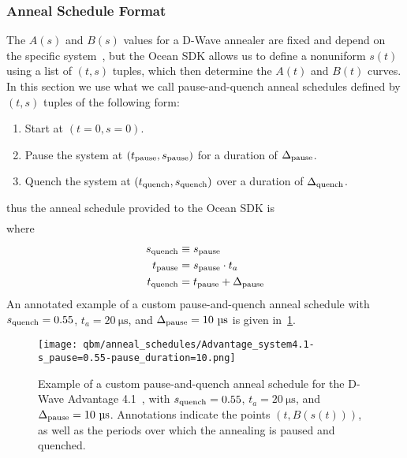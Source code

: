\subsubsection{Anneal Schedule Format}
The \( A(s) \) and \( B(s) \) values for a D-Wave annealer are fixed and depend on the specific system~\cite{dwave_anneal_schedules}, but the Ocean SDK allows us to define a nonuniform \( s(t) \) using a list of \( (t, s) \) tuples, which then determine the \( A(t) \) and \( B(t) \) curves.
In this section we use what we call pause-and-quench anneal schedules defined by \( (t, s) \) tuples of the following form:
\begin{enumerate}
    \item Start at \( (t = 0, s = 0) \).
    \item Pause the system at \( (t_{\text{pause}}, s_{\text{pause}}) \) for a duration of \( \Delta_{\text{pause}} \).
    \item Quench the system at \( (t_{\text{quench}}, s_{\text{quench}}) \) over a duration of \( \Delta_{\text{quench}} \).
\end{enumerate}
thus the anneal schedule provided to the Ocean SDK is
\begin{align}
    [
        (0, 0),
        (\tpause, \spause),
        (\tquench, \squench),
        (\tquench + \Deltaquench, 1)
    ]
\end{align}
where
\begin{align}
\begin{split}
    s_{\text{quench}} &\equiv s_{\text{pause}} \\
    t_{\text{pause}} &= s_{\text{pause}} \cdot t_a \\
    t_{\text{quench}} &= t_{\text{pause}} + \Delta_{\text{pause}}
\end{split}
\end{align}
An annotated example of a custom pause-and-quench anneal schedule with \( s_{\text{quench}} = 0.55 \), \( t_a = 20 \ \si{\micro\second} \), and \( \Deltapause = 10 \ \si{\micro\second} \) is given in~\cref{fig:anneal_schedule_annotated}.
\begin{figure}[!htb]
    \begin{center}
        \texttt{[image: qbm/anneal\_schedules/Advantage\_system4.1-s\_pause=0.55-pause\_duration=10.png]}
    \end{center}
    \caption{Example of a custom pause-and-quench anneal schedule for the D-Wave Advantage 4.1~\cite{dwave_anneal_schedules}, with \( s_{\text{quench}} = 0.55 \), \( t_a = 20 \ \si{\micro\second} \), and \( \Deltapause = 10 \ \si{\micro\second} \). Annotations indicate the points \( (t, B(s(t))) \), as well as the periods over which the annealing is paused and quenched.}
    \label{fig:anneal_schedule_annotated}
\end{figure}


